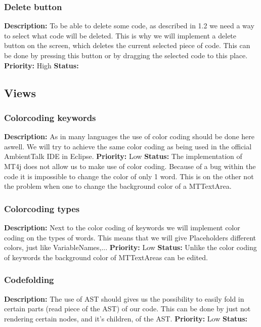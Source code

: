 \documentclass[a4paper,12pt]{report}
\begin{document}
\subsubsection{Delete button}
\textbf{Description: } To be able to delete some code, as described in 1.2 we need a way to select what code will be deleted. This is why we will
implement a delete button on the screen, which deletes the current selected piece of code. This can be done by pressing this button or by dragging the selected code to this place. 
\textbf{Priority:} High \newline
\textbf{Status: } \newline
\subsection{Views}
\subsubsection{Colorcoding keywords}
\textbf{Description: }As in many languages the use of color coding should be done here aswell. We  will try to achieve the same color coding as
being used in the official AmbientTalk IDE in Eclipse. \newline
\textbf{Priority:} Low \newline
\textbf{Status: } The implementation of MT4j does not allow us to make use of color coding. Because of a bug within the code it is impossible
to change the color of only 1 word. This is on the other not the problem when one to change the background color of a MTTextArea. \newline
\subsubsection{Colorcoding types}
\textbf{Description: } Next to the color coding of keywords we will implement color coding on the types of words. This means that we will give
Placeholders different colors, just like VariableNames,... \newline
\textbf{Priority:} Low \newline
\textbf{Status: } Unlike the color coding of keywords the background color of MTTextAreas can be edited.\newline
\subsubsection{Codefolding}
\textbf{Description: }The use of AST should gives us the possibility to easily fold in certain parts (read piece of the AST) of our code. This can be done by just not
rendering certain nodes, and it's children, of the AST. \newline
\textbf{Priority:} Low \newline
\textbf{Status: } \newline
\end{document}

